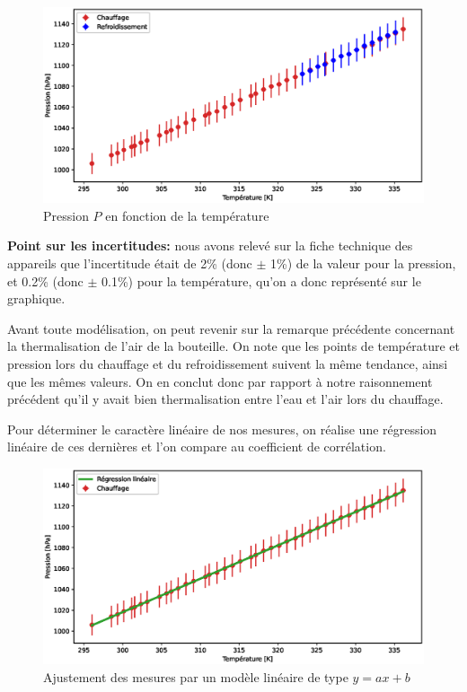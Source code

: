 \documentclass[12pt]{article}
\begin{document}
\begin{figure}[!h]
	\begin{center}
		\includegraphics[scale=0.68]{img/exp2_graph1.eps}
		\caption{Pression $P$ en fonction de la température}
	\end{center}
	\label{Exp2_graph1}
\end{figure}

\textbf{Point sur les incertitudes:} nous avons relevé sur la fiche technique des appareils que l'incertitude était de 2\% (donc $\pm$ 1\%) de la valeur pour la pression, et 0.2\% (donc $\pm$ 0.1\%) pour la température, qu'on a donc représenté sur
le graphique.

Avant toute modélisation, on peut revenir sur la remarque précédente concernant la thermalisation de l'air de la bouteille. On note que les points de température et pression lors du chauffage et 
du refroidissement suivent la même tendance, ainsi que les mêmes valeurs. On en conclut donc par rapport à notre raisonnement précédent qu'il y avait bien thermalisation entre l'eau et l'air lors du chauffage.

\newpage
Pour déterminer le caractère linéaire de nos mesures, on réalise une régression linéaire de ces dernières et l'on compare au coefficient de corrélation. 
\begin{figure}[!h]
	\begin{center}
		\includegraphics[scale=0.65]{img/exp2_graph2.eps}
		\caption{Ajustement des mesures par un modèle linéaire de type $y=ax+b$}
	\end{center}
	\label{Exp2_graph2}
\end{figure}
\end{document}
